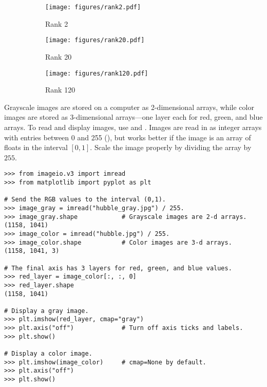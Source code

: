 \begin{figure}[H]
\centering
\begin{subfigure}{.32\textwidth}
    \centering
    \texttt{[image: figures/rank2.pdf]}
    \caption{Rank 2}
\end{subfigure}
%
\begin{subfigure}{.32\textwidth}
    \centering
    \texttt{[image: figures/rank20.pdf]}
    \caption{Rank 20}
    \label{fig:hubble-rank20-approximation}
\end{subfigure}
%
\begin{subfigure}{.32\textwidth}
    \centering
    \texttt{[image: figures/rank120.pdf]}
    \caption{Rank 120}
\end{subfigure}
\caption{}
\label{fig:hubble-svd-rank-approximations}
\end{figure}

Grayscale images are stored on a computer as 2-dimensional arrays, while color images are stored as 3-dimensional arrays---one layer each for red, green, and blue arrays.
To read and display images, use  and .
Images are read in as integer arrays with entries between 0 and 255 (), but  works better if the image is an array of floats in the interval $[0,1]$.
Scale the image properly by dividing the array by $255$.

\begin{lstlisting}
>>> from imageio.v3 import imread
>>> from matplotlib import pyplot as plt

# Send the RGB values to the interval (0,1).
>>> image_gray = imread("hubble_gray.jpg") / 255.
>>> image_gray.shape            # Grayscale images are 2-d arrays.
(1158, 1041)
>>> image_color = imread("hubble.jpg") / 255.
>>> image_color.shape           # Color images are 3-d arrays.
(1158, 1041, 3)

# The final axis has 3 layers for red, green, and blue values.
>>> red_layer = image_color[:, :, 0]
>>> red_layer.shape
(1158, 1041)

# Display a gray image.
>>> plt.imshow(red_layer, cmap="gray")
>>> plt.axis("off")             # Turn off axis ticks and labels.
>>> plt.show()

# Display a color image.
>>> plt.imshow(image_color)     # cmap=None by default.
>>> plt.axis("off")
>>> plt.show()
\end{lstlisting}


